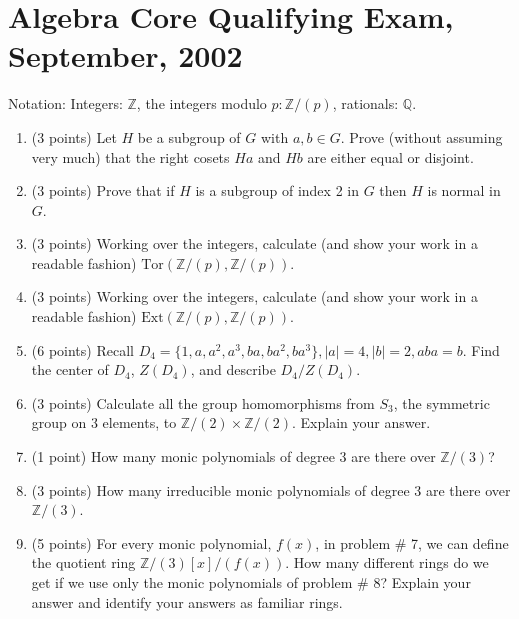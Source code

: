 \documentclass{article}
\begin{document}
\section*{Algebra Core Qualifying Exam, September, 2002}

Notation: Integers: \(\mathbb{Z}\), the integers modulo \(p: \mathbb{Z}/(p)\), rationals: \(\mathbb{Q}\).

\begin{enumerate}
    \item (3 points) Let \(H\) be a subgroup of \(G\) with \(a, b \in G\). Prove (without assuming very much) that the right cosets \(Ha\) and \(Hb\) are either equal or disjoint.

    \item (3 points) Prove that if \(H\) is a subgroup of index 2 in \(G\) then \(H\) is normal in \(G\).

    \item (3 points) Working over the integers, calculate (and show your work in a readable fashion) \(\text{Tor}(\mathbb{Z}/(p), \mathbb{Z}/(p))\).

    \item (3 points) Working over the integers, calculate (and show your work in a readable fashion) \(\text{Ext}(\mathbb{Z}/(p), \mathbb{Z}/(p))\).

    \item (6 points) Recall \(D_4 = \{1, a, a^2, a^3, ba, ba^2, ba^3\}, |a| = 4, |b| = 2, aba = b\). Find the center of \(D_4\), \(Z(D_4)\), and describe \(D_4/Z(D_4)\).

    \item (3 points) Calculate all the group homomorphisms from \(S_3\), the symmetric group on 3 elements, to \(\mathbb{Z}/(2) \times \mathbb{Z}/(2)\). Explain your answer.

    \item (1 point) How many monic polynomials of degree 3 are there over \(\mathbb{Z}/(3)\)?

    \item (3 points) How many irreducible monic polynomials of degree 3 are there over \(\mathbb{Z}/(3)\).

    \item (5 points) For every monic polynomial, \(f(x)\), in problem \# 7, we can define the quotient ring \(\mathbb{Z}/(3)[x]/(f(x))\). How many different rings do we get if we use only the monic polynomials of problem \# 8? Explain your answer and identify your answers as familiar rings.


\end{enumerate}
\end{document}

